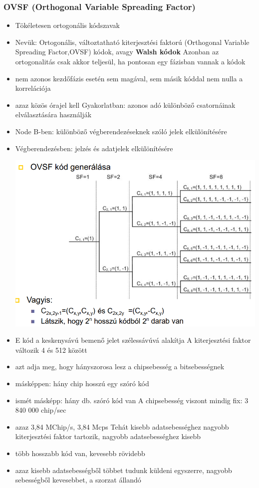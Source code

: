 \documentclass[10pt,a4paper]{article}
\begin{document}
\subsubsection{OVSF (Orthogonal Variable Spreading Factor)}
\begin{itemize}
	\item Tökéletesen ortogonális kódszavak
	\item  Nevük: Ortogonális, változtatható kiterjesztési faktorú (Orthogonal
	Variable Spreading Factor,OVSF) kódok, avagy \textbf{Walsh kódok}
	\subitem  Azonban az ortogonalitás csak akkor teljesül, ha pontosan egy
	fázisban vannak a kódok
	\item nem azonos kezdőfázis esetén sem magával, sem másik kóddal nem
	nulla a korrelációja
	\item azaz közös órajel kell
	\subitem  Gyakorlatban: azonos adó különböző csatornáinak elválasztására
	használják
	\item Node B-ben: különböző végberendezéseknek szóló jelek elkülönítésére
	\item Végberendezésben: jelzés és adatjelek elkülönítésére
	\begin{center}
		\includegraphics[width=0.55\linewidth]{src/OVSF}
	\end{center}
\item E kód a keskenysávú bemenő jelet szélessávúvá alakítja
\subitem A kiterjesztési faktor változik 4 és 512 között
\item azt adja meg, hogy hányszorosa lesz a chipsebesség a
bitsebességnek
\item másképpen: hány chip hosszú egy szóró kód
\item ismét másképp: hány db. szóró kód van
\subitem A chipsebesség viszont mindig fix: 3 840 000 chip/sec
\item azaz 3,84 MChip/s, 3,84 Mcps
\subitem Tehát kisebb adatsebességhez nagyobb kiterjesztési
faktor tartozik, nagyobb adatsebességhez kisebb
\item több hosszabb kód van, kevesebb rövidebb
\item azaz kisebb adatsebességből többet tudunk küldeni egyszerre,
nagyobb sebességből kevesebbet, a szorzat állandó
\end{itemize}
\end{document}
